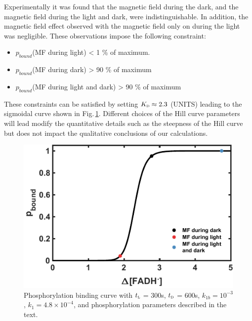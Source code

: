 \documentclass[twoside,twocolumn,9pt]{article}
\begin{document}
Experimentally it was found that the magnetic field during the dark, and the magnetic field during the light and dark, were
indistinguishable. \cite{Pooam2019} In addition, the magnetic field effect observed with the magnetic field only on during the light
was negligible. These observations impose the following constraint:
\begin{itemize}
	\item $p_{bound}$(MF during light) < 1 \% of maximum.
	\item $p_{bound}$(MF during dark) > 90 \% of maximum
	\item $p_{bound}$(MF during light and dark) > 90 \% of maximum
\end{itemize}
These constraints can be satisfied by setting $K_{\textsc{d}} \approx 2.3$ (UNITS) leading to the sigmoidal curve shown in
Fig.\,\ref{fig:sigmoid}. Different choices of the Hill curve parameters will lead modify the quantitative details such as the
steepness of the Hill curve but does not impact the qualitative conclusions of our calculations.
\begin{figure}[h]
	\centering
	\includegraphics{sigmoid.pdf}
	\caption{Phosphorylation binding curve with $t_{\textsc{l}}$ = 300s, $t_{\textsc{d}}$ = 600s, $k_{1b} = 10^{-3}$, $k_{1} = 4.8
		\times 10^{-4}$, and phosphorylation parameters described in the text.}
	\label{fig:sigmoid}
\end{figure}
\end{document}
